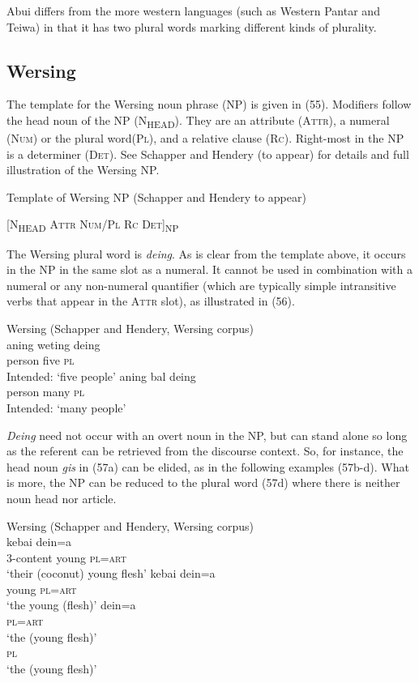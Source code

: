 Abui differs from the more western languages (such as Western Pantar and Teiwa) in that it has two plural words marking different kinds of plurality.

\subsection{Wersing} %
The template for the Wersing noun phrase (NP) is given in (55). Modifiers follow the head noun of the NP (\textsc{N}\textsubscript{\MakeUppercase{head}}). They are an attribute (\textsc{Attr}), a numeral (\textsc{Num}) or the plural word\textsc{(Pl),} and a relative clause (\textsc{Rc).} \textsc{R}ight-most in the NP is a determiner (\textsc{Det}). See Schapper and Hendery (to appear) for details and full illustration of the Wersing NP.

\ea%
\label{ex:55}
 Template of Wersing NP (Schapper and Hendery to appear)

  [\textsc{N}\textsubscript{\MakeUppercase{head } }\textsc{Attr Num/Pl  Rc  Det]}\textsc{\textsubscript{NP}}
\z


The Wersing plural word is \textit{deing}. As is clear from the template above, it occurs in the NP in the same slot as a numeral. It cannot be used in combination with a numeral or any non-numeral quantifier (which are typically simple intransitive verbs that appear in the \textsc{Attr} slot), as illustrated in (56).


\ea%
\label{ex:56}
Wersing (Schapper and Hendery, Wersing corpus)\\
\ea
\gll *aning    weting deing \\
    person five \textsc{pl} \\
 \glt Intended: `five people'
\ex
\gll *aning bal {deing}\\
   person many   \textsc{pl} \\
\glt  Intended: `many people'
\z
\z






\textit{Deing} need not occur with an overt noun in the NP, but can stand alone so long as the referent can be retrieved from the discourse context. So, for instance, the head noun \textit{gis} in (57a) can be elided, as in the following examples (57b-d). What is more, the NP can be reduced to the plural word (57d) where there is neither noun head nor article.


\ea%
\label{ex:57}
Wersing (Schapper and Hendery, Wersing corpus)\\
\ea
{}    kebai dein=a\\
3-content young \textsc{pl=art}  \\
\glt `their (coconut) young flesh'
\ex
\gll kebai dein=a   \\
   young \textsc{pl=art}  \\
\glt `the young (flesh)'
\glt
\ex
\gll dein=a   \\
   \textsc{pl=art}  \\
\glt  `the (young flesh)'
\ex
{}\\
    \textsc{pl}\\
\glt  `the (young flesh)'
\z
\z




